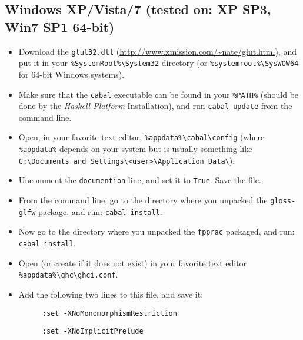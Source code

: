 \documentclass[]{article}
\begin{document}
\subsection{Windows XP/Vista/7 (tested on: XP SP3, Win7 SP1 64-bit)}
\begin{itemize}
  \item Download the \texttt{glut32.dll} (\url{http://www.xmission.com/~nate/glut.html}), and put it in your\newline{} \texttt{\%SystemRoot\%\textbackslash{}System32} directory (or \texttt{\%systemroot\%\textbackslash{}SysWOW64} for 64-bit Windows systems).
  \item Make sure that the \texttt{cabal} executable can be found in your \texttt{\%PATH\%} (should be done by the \emph{Haskell Platform} Installation), and run \texttt{cabal update} from the command line.
  \item Open, in your favorite text editor, \texttt{\%appdata\%\textbackslash{}cabal\textbackslash{}config} (where \texttt{\%appdata\%} depends on your system but is usually something like \texttt{C:\textbackslash{}Documents and Settings\textbackslash{}<user>\textbackslash{}Application Data\textbackslash{}}).
  \item Uncomment the \texttt{documention} line, and set it to \texttt{True}. Save the file.
  \item From the command line, go to the directory where you unpacked the \texttt{gloss-glfw} package, and run: \texttt{cabal install}.
  \item Now go to the directory where you unpacked the \texttt{fpprac} packaged, and run: \texttt{cabal install}.
  \item Open (or create if it does not exist) in your favorite text editor \texttt{\%appdata\%\textbackslash{}ghc\textbackslash{}ghci.conf}.
  \item Add the following two lines to this file, and save it:
  \begin{description}
    \item[] \texttt{:set -XNoMonomorphismRestriction}
    \item[] \texttt{:set -XNoImplicitPrelude}
  \end{description}
\end{itemize}
\end{document}
